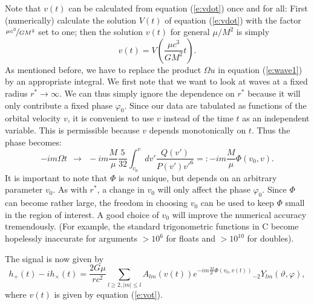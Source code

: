 Note that $v(t)$ can be calculated from equation (\ref{e:vdot}) once and for
all:
First (numerically) calculate the solution $V(t)$ of equation (\ref{e:vdot}) with
the factor $\nicefrac{\mu c^3}{G M^2}$ set to one; then the solution $v(t)$ for general $\mu/M^2$ is
simply
\begin{equation}
  v(t) = V\left(\frac{\mu c^3}{G M^2} t\right).
  \label{e:vot}
\end{equation}  
As mentioned before, we have to replace the product $\Omega u$ in equation (\ref{e:wave1}) by
an appropriate integral. We first note that we want to look at waves at a fixed
radius $r^* \rightarrow \infty$. We can thus simply ignore the dependence on 
$r^*$ because it will only contribute a fixed phase $\varphi_0$. Since 
our data are
tabulated as functions of the orbital velocity $v$, it is convenient to use $v$
instead of the time $t$ as an independent variable. This is permissible 
because
$v$ depends monotonically on $t$. Thus the phase becomes:
\begin{equation}
  -i m \Omega t \ \ \longrightarrow \ \ -i m \frac{M}{\mu} \frac{5}{32}
  \int_{v_0}^v dv' \frac{Q(v')}{P(v') v'^6} =: -i m \frac{M}{\mu} \Phi(v_0,v).
  \label{e:Phi}
\end{equation}
It is important to note that $\Phi$ is {\em not} unique, but depends on
an arbitrary parameter $v_0$. As with $r^*$, a change in $v_0$ will only
affect the phase $\varphi_0$. Since $\Phi$ can become rather large, the
freedom in choosing $v_0$ can be used to keep $\Phi$ small in the region
of interest.  A good choice of $v_0$ will improve the numerical accuracy
tremendously.  (For example, the standard trigonometric functions in C
become hopelessly inaccurate for arguments  $> 10^6$ for floats and $>
10^{10}$ for doubles).

The signal is now given by
\begin{equation}
  h_+(t) - i h_\times(t) = \frac{2 G \mu}{r c^2} \sum_{l\geq 2, |m| \leq l}
            A_{lm}(v(t)) e^{- i m \frac{M}{\mu} \Phi(v_0, v(t))} {}_{-2}Y_{lm}(\vartheta,
                        \varphi),
        \label{e:wave2}
\end{equation}
where $v(t)$ is given by equation (\ref{e:vot}). 

